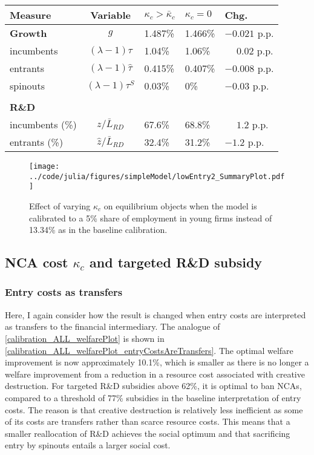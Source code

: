 \documentclass[ecta,nameyear,final]{econsocart}
\theoremstyle{definition}
\begin{document}
\begin{table}[]
	\centering
	\label{reducing_kappa_c_decomposition_table_lowEntry}
	\begin{tabular}{lclll}
		\toprule \toprule
		Measure & Variable & $\kappa_c > \bar{\kappa}_c$ & $\kappa_c = 0$ & Chg. \tabularnewline
		\midrule
		\textbf{Growth} & $g$ & 1.487\% & 1.466\% & $-0.021$ p.p.\tabularnewline
		\multicolumn{1}{l}{\quad incumbents} & $(\lambda -1) \tau$  & 1.04\% & 1.06\% & $\phantom{-}0.02$ p.p. \tabularnewline
		\multicolumn{1}{l}{\quad entrants} & $(\lambda -1) \hat{\tau}$ & 0.415\% & 0.407\% & $-0.008$ p.p. \tabularnewline
		\multicolumn{1}{l}{\quad spinouts} & $(\lambda -1) \tau^S$ & 0.03\% & 0\% & $-0.03$ p.p. \tabularnewline
		\tabularnewline
		\textbf{R\&D} & & & & 
		\tabularnewline
		\multicolumn{1}{l}{\quad incumbents (\%)}  & $z / \bar{L}_{RD}$ & 67.6\% & 68.8\% & $\phantom{-} 1.2$ p.p. \tabularnewline 
		
		\multicolumn{1}{l}{\quad entrants (\%)}  & $\hat{z} / \bar{L}_{RD}$ & 32.4\% & 31.2\% & $-1.2$ p.p. \tabularnewline
		\bottomrule
	\end{tabular}
\end{table}


\begin{figure}[]
	\centering
	\texttt{[image: ../code/julia/figures/simpleModel/lowEntry2\_SummaryPlot.pdf]}
	\caption{Effect of varying $\kappa_c$ on equilibrium objects when the model is calibrated to a 5\% share of employment in young firms instead of 13.34\% as in the baseline calibration.}
	\label{calibration_lowEntry_summaryPlot}
\end{figure}


\newpage 
\subsection{NCA cost $\kappa_c$ and targeted R\&D subsidy}\label{appendix:policyanalysis:allpolicies}

\subsubsection{Entry costs as transfers}

Here, I again consider how the result is changed when entry costs are interpreted as transfers to the financial intermediary. The analogue of \autoref{calibration_ALL_welfarePlot} is shown in \autoref{calibration_ALL_welfarePlot_entryCostsAreTransfers}. The optimal welfare improvement is now approximately 10.1\%, which is smaller as there is no longer a welfare improvement from a reduction in a resource cost associated with creative destruction. For targeted R\&D subsidies above 62\%, it is optimal to ban NCAs, compared to a threshold of 77\% subsidies in the baseline interpretation of entry costs. The reason is that creative destruction is relatively less inefficient as some of its costs are transfers rather than scarce resource costs. This means that a smaller reallocation of R\&D achieves the social optimum and that sacrificing entry by spinouts entails a larger social cost. 
\end{document}
